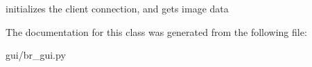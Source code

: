 \begin{DoxyVerb}initializes the client connection, and gets image data
\end{DoxyVerb}
 

The documentation for this class was generated from the following file\-:\begin{DoxyCompactItemize}
\item 
gui/br\-\_\-gui.\-py\end{DoxyCompactItemize}
